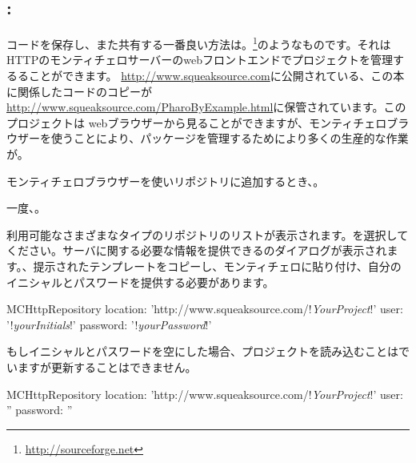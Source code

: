 \documentclass[a4paper,10pt,twoside]{book}
\begin{document}

\subsection{\ind{\sqsrc}: } 
コードを保存し、また共有する一番良い方法は。\footnote{\url{http://sourceforge.net}}のようなものです。それはHTTPのモンティチェロサーバーのwebフロントエンドでプロジェクトを管理するることができます。
\url{http://www.squeaksource.com}に公開されている、この本に関係したコードのコピーが\url{http://www.squeaksource.com/PharoByExample.html}に保管されています。このプロジェクトは webブラウザーから見ることができますが、モンティチェロブラウザーを使うことにより、パッケージを管理するためにより多くの生産的な作業が。

モンティチェロブラウザーを使いリポジトリに追加するとき、。

一度、。

  利用可能なさまざまなタイプのリポジトリのリストが表示されます。を選択してください。サーバに関する必要な情報を提供できるのダイアログが表示されます。、提示されたテンプレートをコピーし、モンティチェロに貼り付け、自分のイニシャルとパスワードを提供する必要があります。 

\begin{code}{}
MCHttpRepository 
    location: 'http://www.squeaksource.com/!\emph{YourProject}!'
    user: '!\emph{yourInitials}!' 
    password: '!\emph{yourPassword}!'
\end{code}   

\noindent
もしイニシャルとパスワードを空にした場合、プロジェクトを読み込むことはでいますが更新することはできません。

\begin{code}{}
MCHttpRepository 
    location: 'http://www.squeaksource.com/!\emph{YourProject}!'
    user: '' 
    password: ''
\end{code}   
\end{document}

